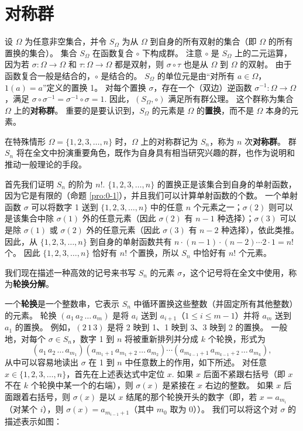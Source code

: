 \section{对称群}

设 \(\Omega\) 为任意非空集合，并令 \(S_\Omega\) 为从 \(\Omega\) 到自身的所有双射的集合（即 \(\Omega\) 的所有置换的集合）。
集合 \(S_\Omega\) 在函数复合 \(\circ\) 下构成群。
注意 \(\circ\) 是 \(S_\Omega\) 上的二元运算，因为若 \(\sigma : \Omega \to \Omega\) 和 \(\tau : \Omega \to \Omega\) 都是双射，则 \(\sigma \circ \tau\) 也是从 \(\Omega\) 到 \(\Omega\) 的双射。
由于函数复合一般是结合的，\(\circ\) 是结合的。
\(S_\Omega\) 的单位元是由“对所有 \(a \in \Omega\)，\(1(a) = a\)”定义的置换 1。
对每个置换 \(\sigma\)，存在一个（双边）逆函数 \(\sigma^{-1} : \Omega \to \Omega\)，满足 \(\sigma \circ \sigma^{-1} = \sigma^{-1} \circ \sigma = 1\). 
因此，\((S_\Omega, \circ)\) 满足所有群公理。
这个群称为集合 \(\Omega\) 上的\textbf{对称群}。
重要的是要认识到，\(S_\Omega\) 的元素是 \(\Omega\) 的\textbf{置换}，而不是 \(\Omega\) 本身的元素。

在特殊情形 \(\Omega = \{1, 2, 3, \ldots, n\}\) 时，\(\Omega\) 上的对称群记为 \(S_n\)，称为 \(n\) 次\textbf{对称群}。
群 \(S_n\) 将在全文中扮演重要角色，既作为自身具有相当研究兴趣的群，也作为说明和推动一般理论的手段。

首先我们证明 \(S_n\) 的阶为 \(n!\). 
\(\{1, 2, 3, \ldots, n\}\) 的置换正是该集合到自身的单射函数，因为它是有限的（命题 \ref{pro:0-1}），并且我们可以计算单射函数的个数。
一个单射函数 \(\sigma\) 可以将数字 1 送到 \(\{1, 2, 3, \ldots, n\}\) 中的任意 \(n\) 个元素之一；\(\sigma(2)\) 则可以是该集合中除 \(\sigma(1)\) 外的任意元素（因此 \(\sigma(2)\) 有 \(n-1\) 种选择）；\(\sigma(3)\) 可以是除 \(\sigma(1)\) 或 \(\sigma(2)\) 外的任意元素（因此 \(\sigma(3)\) 有 \(n-2\) 种选择），依此类推。
因此，从 \(\{1, 2, 3, \ldots, n\}\) 到自身的单射函数共有 \(n \cdot (n-1) \cdot (n-2) \cdots 2 \cdot 1 = n!\) 个。
因此 \(\{1, 2, 3, \ldots, n\}\) 恰好有 \(n!\) 个置换，所以 \(S_n\) 中恰好有 \(n!\) 个元素。

我们现在描述一种高效的记号来书写 \( S_n \) 的元素 \( \sigma \)，这个记号将在全文中使用，称为\textbf{轮换分解}。

一个\textbf{轮换}是一个整数串，它表示 \( S_n \) 中循环置换这些整数（并固定所有其他整数）的元素。
轮换 \( (a_1 \, a_2 \, \dots \, a_m) \) 是将 \( a_i \) 送到 \( a_{i+1} \)（\( 1 \leq i \leq m-1 \)）并将 \( a_m \) 送到 \( a_1 \) 的置换。
例如，\( (2 \, 1 \, 3) \) 是将 2 映到 1、1 映到 3、3 映到 2 的置换。
一般地，对每个 \( \sigma \in S_n \)，数字 1 到 \( n \) 将被重新排列并分成 \( k \) 个轮换，形式为
\[
(a_1 \, a_2 \, \dots \, a_{m_1})(a_{m_1+1} \, a_{m_1+2} \, \dots \, a_{m_2}) \cdots (a_{m_{k-1}+1} \, a_{m_{k-1}+2} \, \dots \, a_{m_k}),
\]
从中可以容易地读出 \( \sigma \) 在 1 到 \( n \) 中任意数上的作用，如下所述。
对任意 \( x \in \{1, 2, 3, \dots, n\} \)，首先在上述表达式中定位 \( x \). 
如果 \( x \) 后面不紧跟右括号（即 \( x \) 不在 \( k \) 个轮换中某一个的右端），则 \( \sigma(x) \) 是紧接在 \( x \) 右边的整数。
如果 \( x \) 后面跟着右括号，则 \( \sigma(x) \) 是以 \( x \) 结尾的那个轮换开头的数字（即，若 \( x = a_{m_i} \)（对某个 \( i \)），则 \( \sigma(x) = a_{m_{i-1}+1} \)（其中 \( m_0 \) 取为 0））。
我们可以将这个对 \( \sigma \) 的描述表示如图：

